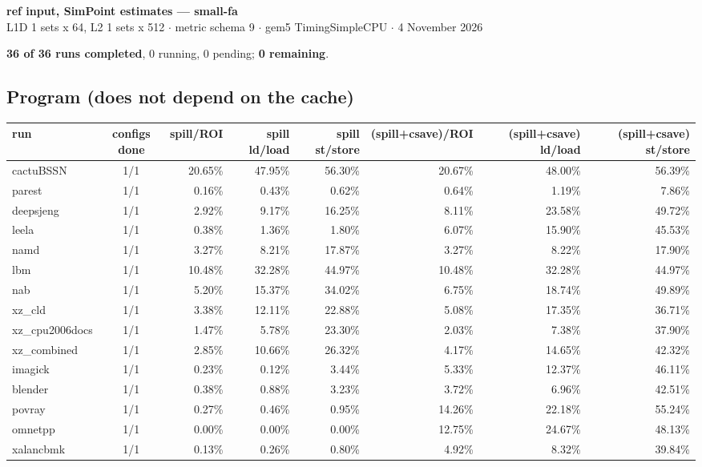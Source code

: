 \documentclass[10pt,a4paper,landscape]{article}
\begin{document}
\begin{center}
{\large\bfseries ref input, SimPoint estimates --- small-fa}\\[3pt]
{\small L1D 1 sets x 64, L2 1 sets x 512 $\cdot$ metric schema 9 $\cdot$ gem5 TimingSimpleCPU $\cdot$ 4 November 2026}
\end{center}
\textbf{36 of 36 runs completed}, 0 running, 0 pending; \textbf{0 remaining}.\par
\subsection*{Program (does not depend on the cache)}
{\footnotesize
\begin{longtable}{lcrrrrrr}
\toprule
run & configs done & spill/ROI & spill ld/load & spill st/store & (spill+csave)/ROI & (spill+csave) ld/load & (spill+csave) st/store \\
\midrule
\endhead
\bottomrule
\endfoot
cactuBSSN & 1/1 & 20.65\% & 47.95\% & 56.30\% & 20.67\% & 48.00\% & 56.39\% \\
parest & 1/1 & 0.16\% & 0.43\% & 0.62\% & 0.64\% & 1.19\% & 7.86\% \\
deepsjeng & 1/1 & 2.92\% & 9.17\% & 16.25\% & 8.11\% & 23.58\% & 49.72\% \\
leela & 1/1 & 0.38\% & 1.36\% & 1.80\% & 6.07\% & 15.90\% & 45.53\% \\
namd & 1/1 & 3.27\% & 8.21\% & 17.87\% & 3.27\% & 8.22\% & 17.90\% \\
lbm & 1/1 & 10.48\% & 32.28\% & 44.97\% & 10.48\% & 32.28\% & 44.97\% \\
nab & 1/1 & 5.20\% & 15.37\% & 34.02\% & 6.75\% & 18.74\% & 49.89\% \\
xz\_cld & 1/1 & 3.38\% & 12.11\% & 22.88\% & 5.08\% & 17.35\% & 36.71\% \\
xz\_cpu2006docs & 1/1 & 1.47\% & 5.78\% & 23.30\% & 2.03\% & 7.38\% & 37.90\% \\
xz\_combined & 1/1 & 2.85\% & 10.66\% & 26.32\% & 4.17\% & 14.65\% & 42.32\% \\
imagick & 1/1 & 0.23\% & 0.12\% & 3.44\% & 5.33\% & 12.37\% & 46.11\% \\
blender & 1/1 & 0.38\% & 0.88\% & 3.23\% & 3.72\% & 6.96\% & 42.51\% \\
povray & 1/1 & 0.27\% & 0.46\% & 0.95\% & 14.26\% & 22.18\% & 55.24\% \\
omnetpp & 1/1 & 0.00\% & 0.00\% & 0.00\% & 12.75\% & 24.67\% & 48.13\% \\
xalancbmk & 1/1 & 0.13\% & 0.26\% & 0.80\% & 4.92\% & 8.32\% & 39.84\% \\

\end{longtable}}
\end{document}
